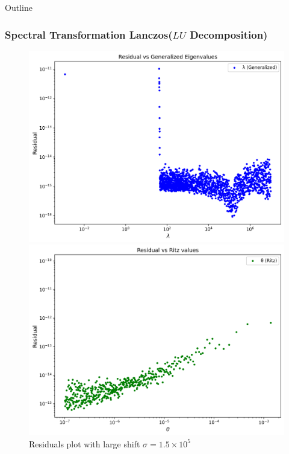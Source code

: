 \documentclass[landscape]{beamer}
\begin{document}
\begin{frame}[allowframebreaks]{Outline}
  \frametitle{Spectral Transformation Lanczos($LU$ Decomposition)}

\begin{figure}
	\caption{Residuals plot with large shift $\sigma=1.5 \times 10^5$}
	\vspace{1ex}
	\begin{minipage}{0.45\textwidth} %
		\centering
		\includegraphics[scale=.25]{./Plots/LU/residual_lu_gl.png}
		\subcaption{}
	\end{minipage}%
	\hfill
	\begin{minipage}{0.45\textwidth}
		\centering
		\includegraphics[scale=.25]{./Plots/LU/residual_lu_rl.png}
		\subcaption{}
	\end{minipage}
	

\end{figure}
\end{frame}
\end{document}

